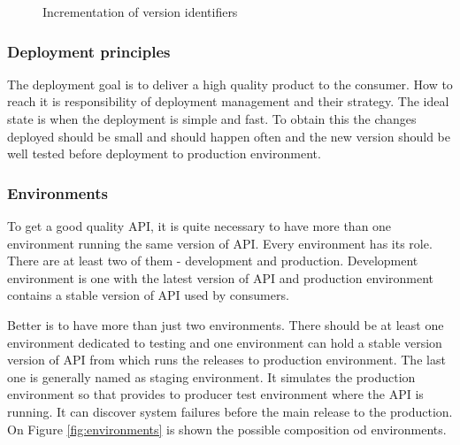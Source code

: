 \begin{figure}[htp] 
\caption{Incrementation of version identifiers}
\label{fig:version-identifying}
\end{figure} 


\subsubsection{Deployment principles}
The deployment goal is to deliver a high quality product to the consumer. How to reach it is responsibility of deployment management and their strategy. The ideal state is when the deployment is simple and fast. To obtain this the changes deployed should be small and should happen often and the new version should be well tested before deployment to production environment.

\subsubsection{Environments}
To get a good quality API, it is quite necessary to have more than one environment running the same version of API. Every environment has its role. There are at least two of them - development and production. Development environment is one with the latest version of API and production environment contains a stable version of API used by consumers.

Better is to have more than just two environments. There should be at least one environment dedicated to testing and one environment can hold a stable version version of API from which runs the releases to production environment. The last one is generally named as staging environment. It simulates the production environment so that provides to producer test environment where the API is running. It can discover system failures before the main release to the production. On Figure \ref{fig:environments} is shown the possible composition od environments.

